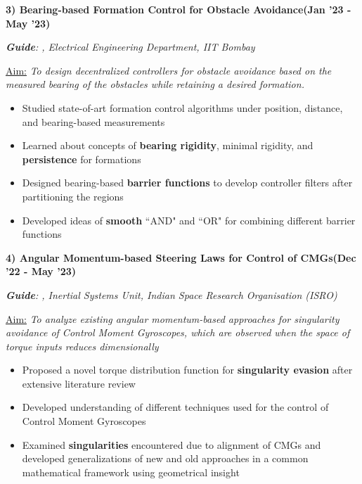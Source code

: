 \documentclass[10pt,letterpaper,sans]{moderncv}        %
\newcommand\x{1}
\newcommand\y{4}
\begin{document}
\hrulefill{}
\vspace{\y pt}

\textbf{3) Bearing-based Formation Control for Obstacle Avoidance}\hfill{\textbf{(Jan '23 - May '23)}}

\textit{\textbf{Guide}: , Electrical Engineering Department, IIT Bombay} 

\vspace{\x pt}

\textcolor{mygray}{
\underline{Aim:}
\textit{To design decentralized controllers for obstacle avoidance based on the measured bearing of the obstacles while retaining a desired formation.}%
}\vspace{\x pt}
\begin{itemize}
\item Studied state-of-art formation control algorithms under position, distance, and bearing-based measurements
\item Learned about concepts of \textbf{bearing rigidity}, minimal rigidity, and \textbf{persistence} for formations
\item Designed bearing-based \textbf{barrier functions} to develop controller filters after partitioning the regions
\item Developed ideas of \textbf{smooth} ``AND" and ``OR" for combining different barrier functions
\end{itemize}

\hrulefill{}
\vspace{\y pt}


\textbf{4) Angular Momentum-based Steering Laws for Control of CMGs}\hfill{\textbf{(Dec '22 - May '23)}}

\textit{\textbf{Guide}: , Inertial Systems Unit, Indian Space Research Organisation (ISRO)} 

\vspace{\x pt}

\textcolor{mygray}{
\underline{Aim:}
\textit{To analyze existing angular momentum-based approaches for singularity avoidance of Control Moment Gyroscopes, which are observed when the space of torque inputs reduces dimensionally}
}\vspace{\x pt}
\begin{itemize}
    \item Proposed a novel torque distribution function for \textbf{singularity evasion} after extensive literature review
    \item Developed understanding of different techniques used for the control of Control Moment Gyroscopes
    \item Examined \textbf{singularities} encountered due to alignment of CMGs and developed generalizations of new and old approaches in a common mathematical framework using geometrical insight
\end{itemize}
\end{document}
